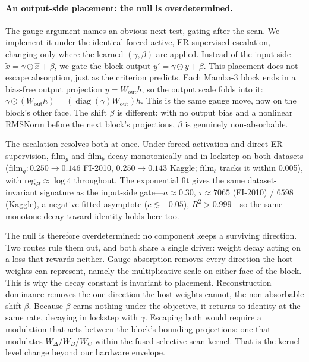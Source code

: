 \documentclass{article}
\newcommand{\filmG}{\mathrm{film}_g}
\newcommand{\filmB}{\mathrm{film}_b}
\newcommand{\regH}{\mathrm{reg}_H}
\DeclareMathOperator{\diag}{diag}
\begin{document}
\paragraph{An output-side placement: the null is overdetermined.} The gauge argument names an obvious next test, gating after the scan. We implement it under the identical forced-active, ER-supervised escalation, changing only where the learned $(\gamma,\beta)$ are applied. Instead of the input-side $\tilde{x}=\gamma\odot\hat{x}+\beta$, we gate the block output $y'=\gamma\odot y+\beta$. This placement does not escape absorption, just as the criterion predicts. Each Mamba-3 block ends in a bias-free output projection $y=W_{\mathrm{out}}h$, so the output scale folds into it: $\gamma\odot(W_{\mathrm{out}}h)=(\diag(\gamma)W_{\mathrm{out}})h$. This is the same gauge move, now on the block's other face. The shift $\beta$ is different: with no output bias and a nonlinear RMSNorm before the next block's projections, $\beta$ is genuinely non-absorbable.

The escalation resolves both at once. Under forced activation and direct ER supervision, $\filmG$ and $\filmB$ decay monotonically and in lockstep on both datasets ($\filmG:0.250\to0.146$ FI-2010, $0.250\to0.143$ Kaggle; $\filmB$ tracks it within 0.005), with $\regH\approx\log4$ throughout. The exponential fit gives the same dataset-invariant signature as the input-side gate---$a\approx0.30$, $\tau\approx7065$ (FI-2010) / $6598$ (Kaggle), a negative fitted asymptote ($c\lesssim-0.05$), $R^2>0.999$---so the same monotone decay toward identity holds here too.

The null is therefore overdetermined: no component keeps a surviving direction. Two routes rule them out, and both share a single driver: weight decay acting on a loss that rewards neither. Gauge absorption removes every direction the host weights can represent, namely the multiplicative scale on either face of the block. This is why the decay constant is invariant to placement. Reconstruction dominance removes the one direction the host weights cannot, the non-absorbable shift $\beta$. Because $\beta$ earns nothing under the objective, it returns to identity at the same rate, decaying in lockstep with $\gamma$. Escaping both would require a modulation that acts between the block's bounding projections: one that modulates $W_\Delta/W_B/W_C$ within the fused selective-scan kernel. That is the kernel-level change beyond our hardware envelope.
\end{document}
